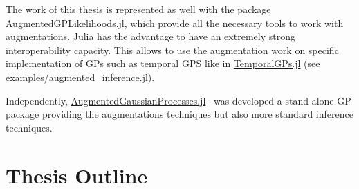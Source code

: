 The work of this thesis is represented as well with the package \href{https://github.com/JuliaGaussianProcesses/AugmentedGPLikelihoods.jl}{AugmentedGPLikelihoods.jl}, which provide all the necessary tools to work with augmentations.
Julia has the advantage to have an extremely strong interoperability capacity.
This allows to use the augmentation work on specific implementation of \ac{GPs} such as temporal \ac{GPS} like in \href{https://github.com/JuliaGaussianProcesses/TemporalGPs.jl}{TemporalGPs.jl} (see examples/augmented\_inference.jl).

Independently, \href{https://github.com/theogf/AugmentedGaussianProcesses.jl}{AugmentedGaussianProcesses.jl}~\cite{theo_galy_fajou_2021_5728215} was developed a stand-alone \ac{GP} package providing the augmentations techniques but also more standard inference techniques. 

\section{Thesis Outline}

